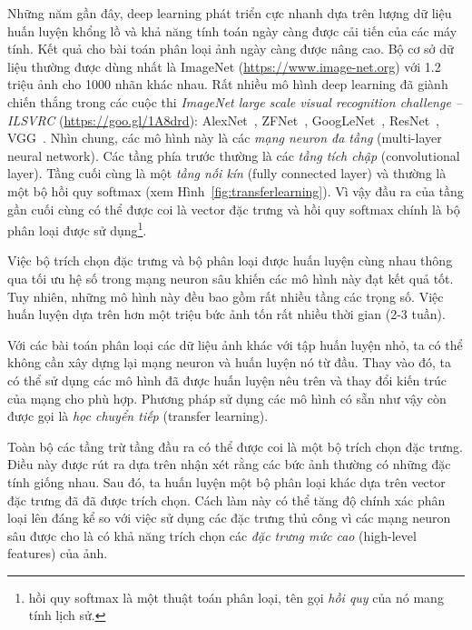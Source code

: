 Những năm gần đây, deep learning phát triển cực nhanh dựa trên lượng dữ liệu
huấn luyện khổng lồ và khả năng tính toán ngày càng được cải tiến của các máy
tính. Kết quả cho bài toán phân loại ảnh ngày càng được nâng cao. Bộ cơ sở dữ
liệu thường được dùng nhất là ImageNet (\url{https://www.image-net.org}) với 1.2
triệu ảnh cho 1000 nhãn khác nhau. Rất nhiều mô hình deep learning đã giành
chiến thắng trong các cuộc thi \textit{ImageNet large scale visual recognition
challenge -- ILSVRC} (\url{https://goo.gl/1A8drd}):
AlexNet~\cite{krizhevsky2012imagenet}, ZFNet~\cite{zeiler2014visualizing},
GoogLeNet~\cite{szegedy2015going}, ResNet~\cite{he2016deep},
VGG~\cite{simonyan2014very}. Nhìn chung, các mô hình này là các \textit{mạng neuron đa tầng} (multi-layer neural network). Các tầng phía trước thường là các \textit{tầng tích chập} (convolutional layer). Tầng cuối cùng là một \textit{tầng nối kín} (fully connected layer) và thường là một bộ hồi quy
softmax (xem Hình~\ref{fig:transferlearning}). Vì vậy đầu ra của tầng gần cuối
cùng có thể được coi là vector đặc trưng và hồi quy softmax chính là bộ phân
loại được sử dụng\footnote{hồi quy softmax là một thuật toán phân loại, tên gọi \textit{hồi quy} của nó mang tính lịch sử.}.
 
Việc bộ trích chọn đặc trưng và bộ phân loại được huấn luyện cùng nhau thông qua
tối ưu hệ số trong mạng neuron sâu khiến các mô hình này đạt kết quả tốt. Tuy
nhiên, những mô hình này đều bao gồm rất nhiều tầng các trọng số. Việc huấn
luyện dựa trên hơn một triệu bức ảnh tốn rất nhiều thời gian (2-3 tuần).
 
Với các bài toán phân loại các dữ liệu ảnh khác với tập huấn luyện nhỏ, ta có
thể không cần xây dựng lại mạng neuron và huấn luyện nó từ đầu. Thay vào đó, ta có
thể sử dụng các mô hình đã được huấn luyện nêu trên và thay đổi kiến trúc của mạng cho phù hợp. Phương pháp sử dụng các mô hình có sẵn như vậy còn
được gọi là \textit{học chuyển tiếp} ({transfer learning}).
 
Toàn bộ các tầng trừ tầng đầu ra có thể được coi là một bộ trích chọn đặc trưng.
Điều này được rút ra dựa trên nhận xét rằng các bức ảnh thường có những đặc tính
giống nhau. Sau đó, ta huấn luyện một bộ phân loại khác dựa trên
vector đặc trưng đã đã được trích chọn. Cách làm này có thể tăng độ chính xác
phân loại lên đáng kể so với việc sử dụng các đặc trưng thủ công vì các mạng neuron sâu được cho là có khả năng trích chọn các \textit{đặc trưng mức cao} ({high-level features}) của ảnh. 

